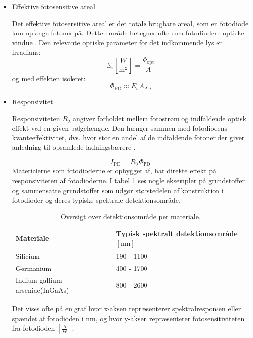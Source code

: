 \begin{itemize}
    \item Effektive fotosensitive areal

Det effektive fotosensitive areal er det totale brugbare areal, som en fotodiode kan opfange fotoner på. Dette område betegnes ofte som fotodiodens optiske vindue \cite[s.~388]{Pedrotti2017}. Den relevante optiske parameter for det indkommende lys er irradians:
\begin{equation}
    E_e \left[\frac{W}{\text{m}^2}\right]= \frac{\Phi_{\mathrm{opt}}}{A} 
\end{equation}
og med effekten isoleret:
\begin{equation}
    \Phi_{\mathrm{PD}} \approx E_e A_{\mathrm{PD}}
\end{equation}

    \item Responsivitet

Responsiviteten $R_{\lambda}$ angiver forholdet mellem fotostrøm og indfaldende optisk effekt ved en given bølgelængde. Den hænger sammen med fotodiodens kvanteeffektivitet, dvs. hvor stor en andel af de indfaldende fotoner der giver anledning til opsamlede ladningsbærere \cite[s.~390]{Pedrotti2017}.

\begin{equation}
    I_{\mathrm{PD}} = R_{\lambda}\Phi_{\mathrm{PD}}
\end{equation}
Materialerne som fotodioderne er opbygget af, har direkte effekt på responsiviteten af fotodioderne. I tabel \ref{tab:spektralrespons} ses nogle eksempler på grundstoffer og sammensatte grundstoffer som udgør størstedelen af konstruktion i fotodioder og deres typiske spektrale detektionsområde. 


\begin{table}[h]
\centering
\caption{Oversigt over detektionsområde per materiale.}
\label{tab:spektralrespons}
\begin{tabular}{ll}
\toprule
Materiale & Typisk spektralt detektionsområde $[\text{nm}]$ \\
\midrule
Silicium & 190 - 1100  \\
Germanium & 400 - 1700 \\
Indium gallium arsenide(InGaAs) & 800 - 2600  \\
\bottomrule
\end{tabular}
\end{table}

Det vises ofte på en graf hvor x-aksen repræsenterer spektralresponsen eller spændet af fotodioden i nm, og hvor y-aksen repræsenterer fotosensitiviteten fra fotodioden $\left[\frac{\text{A}}{\text{W}}\right]$.


\end{itemize}
